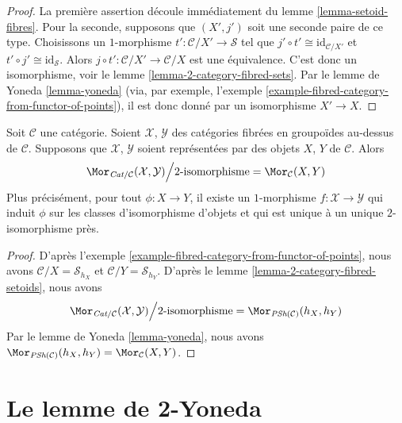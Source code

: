 \begin{proof}
La première assertion découle immédiatement du
lemme \ref{lemma-setoid-fibres}.
Pour la seconde, supposons que $(X', j')$ soit
une seconde paire de ce type. Choisissons un $1$-morphisme
$t' : \mathcal{C}/X' \to \mathcal{S}$ tel que
$j' \circ t' \cong \text{id}_{\mathcal{C}/X'}$ et
$t' \circ j' \cong \text{id}_\mathcal{S}$. Alors
$j \circ t' : \mathcal{C}/X' \to \mathcal{C}/X$ est une équivalence.
C'est donc un isomorphisme, voir le lemme \ref{lemma-2-category-fibred-sets}.
Par le lemme de Yoneda \ref{lemma-yoneda} (via, par exemple,
l'exemple \ref{example-fibred-category-from-functor-of-points}),
il est donc donné par un isomorphisme $X' \to X$.
\end{proof}

\begin{lemma}
\label{lemma-morphisms-representable-fibred-categories}
Soit $\mathcal{C}$ une catégorie.
Soient $\mathcal{X}$, $\mathcal{Y}$ des catégories fibrées en groupoïdes
au-dessus de $\mathcal{C}$. Supposons que $\mathcal{X}$, $\mathcal{Y}$
soient représentées par des objets $X$, $Y$ de $\mathcal{C}$.
Alors
$$
\Mor_{\textit{Cat}/\mathcal{C}}(\mathcal{X}, \mathcal{Y})
\Big/
2\text{-isomorphisme}
=
\Mor_\mathcal{C}(X, Y)
$$
Plus précisément, pour tout $\phi : X \to Y$, il existe un
$1$-morphisme $f : \mathcal{X} \to \mathcal{Y}$ qui induit
$\phi$ sur les classes d'isomorphisme d'objets et
qui est unique à un unique $2$-isomorphisme près.
\end{lemma}

\begin{proof}
D'après
l'exemple \ref{example-fibred-category-from-functor-of-points},
nous avons $\mathcal{C}/X = \mathcal{S}_{h_X}$ et
$\mathcal{C}/Y = \mathcal{S}_{h_Y}$. D'après le
lemme \ref{lemma-2-category-fibred-setoids},
nous avons
$$
\Mor_{\textit{Cat}/\mathcal{C}}(\mathcal{X}, \mathcal{Y})
\Big/
2\text{-isomorphisme}
=
\Mor_{\textit{PSh}(\mathcal{C})}(h_X, h_Y)
$$
Par le lemme de Yoneda
\ref{lemma-yoneda},
nous avons $\Mor_{\textit{PSh}(\mathcal{C})}(h_X, h_Y)
= \Mor_\mathcal{C}(X, Y)$.
\end{proof}








\section{Le lemme de 2-Yoneda}
\label{section-2-yoneda}

